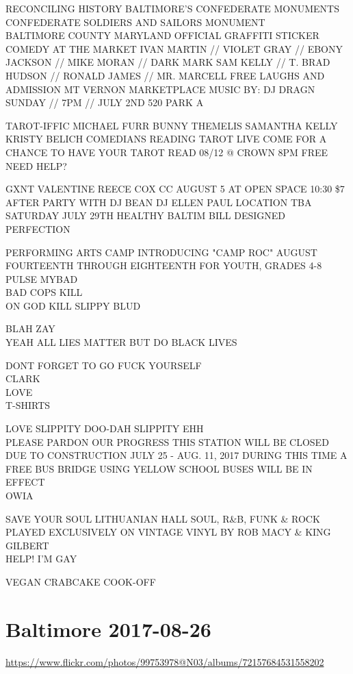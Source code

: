 \documentclass[10pt,letterpaper]{article}
\begin{document}
RECONCILING HISTORY BALTIMORE'S CONFEDERATE MONUMENTS CONFEDERATE SOLDIERS AND SAILORS MONUMENT\\
BALTIMORE COUNTY MARYLAND OFFICIAL GRAFFITI STICKER\\
COMEDY AT THE MARKET IVAN MARTIN // VIOLET GRAY  // EBONY JACKSON // MIKE MORAN // DARK MARK SAM KELLY // T. BRAD HUDSON // RONALD JAMES // MR. MARCELL FREE LAUGHS AND ADMISSION MT VERNON MARKETPLACE MUSIC BY: DJ DRAGN SUNDAY // 7PM // JULY 2ND 520 PARK A

TAROT{-}IFFIC MICHAEL FURR BUNNY THEMELIS SAMANTHA KELLY KRISTY BELICH COMEDIANS READING TAROT LIVE COME FOR A CHANCE TO HAVE YOUR TAROT READ 08/12 @ CROWN 8PM FREE\\
NEED HELP?

GXNT VALENTINE REECE COX CC AUGUST 5 AT OPEN SPACE 10:30 \$7 AFTER PARTY WITH DJ BEAN DJ ELLEN PAUL LOCATION TBA\\
SATURDAY JULY 29TH HEALTHY BALTIM BILL DESIGNED PERFECTION

PERFORMING ARTS CAMP INTRODUCING "CAMP ROC" AUGUST FOURTEENTH THROUGH EIGHTEENTH FOR YOUTH, GRADES 4{-}8\\
PULSE MYBAD\\
BAD COPS KILL\\
ON GOD KILL SLIPPY BLUD

BLAH ZAY\\
YEAH ALL LIES MATTER BUT DO BLACK LIVES

DONT FORGET TO GO FUCK YOURSELF\\
CLARK\\
LOVE\\
T{-}SHIRTS

LOVE SLIPPITY DOO{-}DAH SLIPPITY EHH\\
PLEASE PARDON OUR PROGRESS THIS STATION WILL BE CLOSED DUE TO CONSTRUCTION JULY 25 {-} AUG. 11, 2017 DURING THIS TIME A FREE BUS BRIDGE USING YELLOW SCHOOL BUSES WILL BE IN EFFECT\\
OWIA

SAVE YOUR SOUL LITHUANIAN HALL SOUL, R\&B, FUNK \& ROCK PLAYED EXCLUSIVELY ON VINTAGE VINYL BY ROB MACY \& KING GILBERT\\
HELP!  I'M GAY

VEGAN CRABCAKE COOK{-}OFF
\pagebreak

\section*{Baltimore 2017-08-26}

\url{https://www.flickr.com/photos/99753978@N03/albums/72157684531558202}
\end{document}
